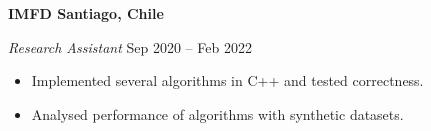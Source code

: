 \documentclass[../main.tex]{subfiles}
\begin{document}
    \textbf{IMFD \hfill  Santiago, Chile} \par
    \textit{Research Assistant} \hfill Sep 2020 -- Feb 2022 \par
    \begin{itemize}
        \item Implemented several algorithms in C++ and tested correctness.
        \item Analysed performance of algorithms with synthetic datasets.
\end{itemize} \par
\end{document}
